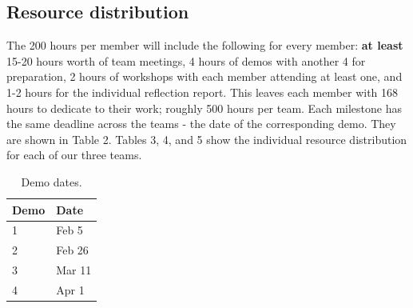 \documentclass{article}
\begin{document}
\subsection{Resource distribution}

The 200 hours per member will include the following for every member: {\bf at least} 15-20 hours worth of team meetings, 4 hours of demos with another 4 for preparation, 2 hours of workshops with each member attending at least one, and 1-2 hours for the individual reflection report. This leaves each member with 168 hours to dedicate to their work; roughly 500 hours per team. Each milestone has the same deadline across the teams - the date of the corresponding demo. They are shown in Table 2. Tables 3, 4, and 5 show the individual resource distribution for each of our three teams.
\begin{table}[]
  \begin{center}
  \begin{tabular}{ll}
    \hline
    Demo & Date   \\
    \hline
    1 & Feb 5 \\
    2 & Feb 26 \\
    3 & Mar 11 \\
    4 & Apr 1\\ \hline
  \end{tabular}
  \end{center}
  \caption{Demo dates.}
\end{table}
\end{document}
